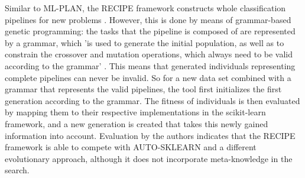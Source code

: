 Similar to ML-PLAN, the RECIPE framework constructs whole classification pipelines for new problems \cite{DBLP:conf/eurogp/SaPOP17}. However, this is done by means of grammar-based genetic programming: the tasks that the pipeline is composed of are represented by a grammar, which 'is used to generate the initial population, as well as to constrain the crossover and mutation operations, which always need to be valid according to the grammar' \cite{DBLP:conf/eurogp/SaPOP17}. This means that generated individuals representing complete pipelines can never be invalid. So for a new data set combined with a grammar that represents the valid pipelines, the tool first initializes the first generation according to the grammar. The fitness of individuals is then evaluated by mapping them to their respective implementations in the scikit-learn framework, and a new generation is created that takes this newly gained information into account. Evaluation by the authors indicates that the RECIPE framework is able to compete with AUTO-SKLEARN and a different evolutionary approach, although it does not incorporate meta-knowledge in the search.